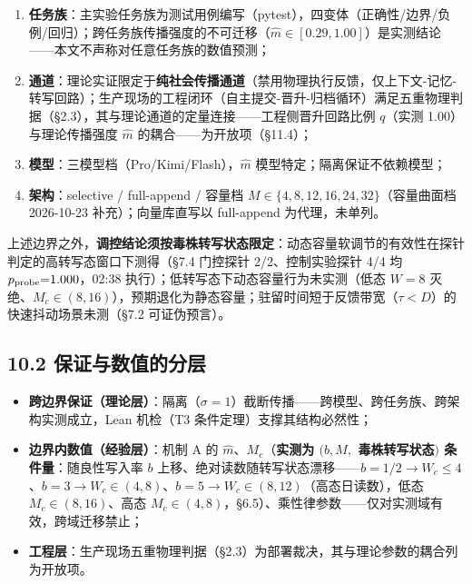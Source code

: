 \documentclass[
]{ctexart}
\providecommand{\tightlist}{%
  \setlength{\itemsep}{0pt}\setlength{\parskip}{0pt}}
\begin{document}
\begin{enumerate}
\def\labelenumi{\arabic{enumi}.}
\tightlist
\item
  \textbf{任务族}：主实验任务族为测试用例编写（pytest），四变体（正确性/边界/负例/回归）；跨任务族传播强度的不可迁移（\(\hat m\in[0.29,1.00]\)）是实测结论------本文不声称对任意任务族的数值预测；
\item
  \textbf{通道}：理论实证限定于\textbf{纯社会传播通道}（禁用物理执行反馈，仅上下文-记忆-转写回路）；生产现场的工程闭环（自主提交-晋升-归档循环）满足五重物理判据（§2.3），其与理论通道的定量连接------工程侧晋升回路比例
  \(q\)（实测 1.00）与理论传播强度 \(\hat m\)
  的耦合------为开放项（§11.4）；
\item
  \textbf{模型}：三模型档（Pro/Kimi/Flash），\(\hat m\)
  模型特定；隔离保证不依赖模型；
\item
  \textbf{架构}：selective / full-append / 容量档
  \(M\in\{4,8,12,16,24,32\}\)（容量曲面档 2026-10-23
  补充）；向量库直写以 full-append 为代理，未单列。
\end{enumerate}

上述边界之外，\textbf{调控结论须按毒株转写状态限定}：动态容量软调节的有效性在探针判定的高转写态窗口下测得（§7.4
门控探针 2/2、控制实验探针 4/4 均 \(p_{\rm probe}{=}1.000\)，02:38
执行）；低转写态下动态容量行为未实测（低态 \(W{=}8\)
灭绝、\(M_c\in(8,16)\)），预期退化为静态容量；驻留时间短于反馈带宽（\(\tau<D\)）的快速抖动场景未测（§7.2
可证伪预言）。

\subsection{10.2
保证与数值的分层}\label{ux4fddux8bc1ux4e0eux6570ux503cux7684ux5206ux5c42}

\begin{itemize}
\tightlist
\item
  \textbf{跨边界保证（理论层）}：隔离（\(\sigma=1\)）截断传播------跨模型、跨任务族、跨架构实测成立，Lean
  机检（T3 条件定理）支撑其结构必然性；
\item
  \textbf{边界内数值（经验层）}：机制 A 的
  \(\hat m\)、\(M_c\)（\textbf{实测为 \((b,M,\) 毒株转写状态\()\)
  条件量}：随良性写入率 \(b\)
  上移、绝对读数随转写状态漂移------\(b=1/2\to W_c\le4\)、\(b=3\to W_c\in(4,8)\)、\(b=5\to W_c\in(8,12)\)（高态日读数），低态
  \(M_c\in(8,16)\)、高态
  \(M_c\in(4,8)\)，§6.5）、乘性律参数------仅对实测域有效，跨域迁移禁止；
\item
  \textbf{工程层}：生产现场五重物理判据（§2.3）为部署裁决，其与理论参数的耦合列为开放项。
\end{itemize}
\end{document}
